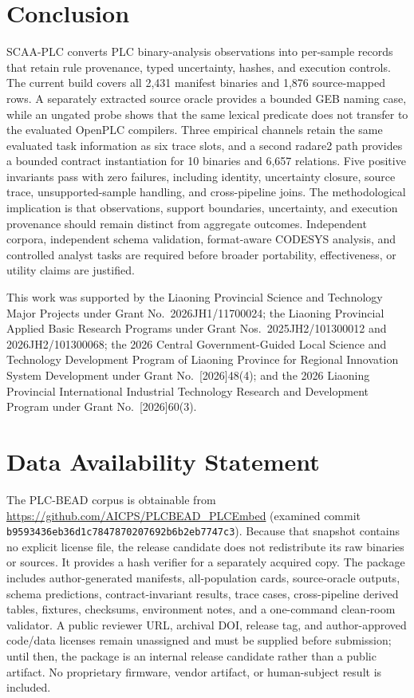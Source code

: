 \documentclass[manuscript,screen,review]{acmart}
\begin{document}
\section{Conclusion}

SCAA-PLC converts PLC binary-analysis observations into per-sample records that retain rule provenance, typed uncertainty, hashes, and execution controls. The current build covers all 2{,}431 manifest binaries and 1{,}876 source-mapped rows. A separately extracted source oracle provides a bounded GEB naming case, while an ungated probe shows that the same lexical predicate does not transfer to the evaluated OpenPLC compilers. Three empirical channels retain the same evaluated task information as six trace slots, and a second radare2 path provides a bounded contract instantiation for 10 binaries and 6{,}657 relations. Five positive invariants pass with zero failures, including identity, uncertainty closure, source trace, unsupported-sample handling, and cross-pipeline joins. The methodological implication is that observations, support boundaries, uncertainty, and execution provenance should remain distinct from aggregate outcomes. Independent corpora, independent schema validation, format-aware CODESYS analysis, and controlled analyst tasks are required before broader portability, effectiveness, or utility claims are justified.


\begin{acks}

This work was supported by the Liaoning Provincial Science and Technology Major Projects under Grant No.~2026JH1/11700024; the Liaoning Provincial Applied Basic Research Programs under Grant Nos.~2025JH2/101300012 and 2026JH2/101300068; the 2026 Central Government-Guided Local Science and Technology Development Program of Liaoning Province for Regional Innovation System Development under Grant No.~[2026]48(4); and the 2026 Liaoning Provincial International Industrial Technology Research and Development Program under Grant No.~[2026]60(3).

\end{acks}

\section*{Data Availability Statement}

The PLC-BEAD corpus is obtainable from \url{https://github.com/AICPS/PLCBEAD_PLCEmbed} (examined commit \texttt{b9593436eb36d1c7847870207692b6b2eb7747c3}). Because that snapshot contains no explicit license file, the release candidate does not redistribute its raw binaries or sources. It provides a hash verifier for a separately acquired copy. The package includes author-generated manifests, all-population cards, source-oracle outputs, schema predictions, contract-invariant results, trace cases, cross-pipeline derived tables, fixtures, checksums, environment notes, and a one-command clean-room validator. A public reviewer URL, archival DOI, release tag, and author-approved code/data licenses remain unassigned and must be supplied before submission; until then, the package is an internal release candidate rather than a public artifact. No proprietary firmware, vendor artifact, or human-subject result is included.




\end{document}
